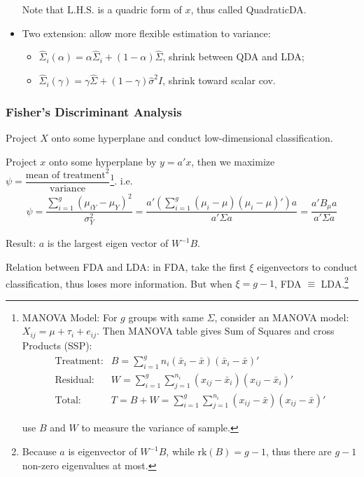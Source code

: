 \begin{itemize}[topsep=2pt,itemsep=2pt]
        Note that $  \mathrm{L.H.S.} $ is a quadric form of $ x $, thus called QuadraticDA.
        \item Two extension: allow more flexible estimation to variance:
        \begin{itemize}[topsep=2pt,itemsep=2pt]
            \item $ \hat{\Sigma }_i(\alpha )=\alpha\hat{\Sigma }_i+(1-\alpha )\hat{\Sigma } $, shrink between QDA and LDA;
            \item $ \hat{\Sigma }_i(\gamma )=\gamma \hat{\Sigma }+(1-\gamma )\hat{\sigma }^2I $, shrink toward scalar cov.
        \end{itemize}
        
            
    \end{itemize}
    

\subsubsection{Fisher's Discriminant Analysis}
    Project $ X $ onto some hyperplane and conduct low-dimensional classification.

    Project $ x $ onto some hyperplane by $ y=a'x  $, then we maximize $ \psi =\dfrac{\text{mean of treatment}^2}{\text{variance}} $\footnote{MANOVA Model:    
    For $ g $ groups with same $ \Sigma  $, consider an MANOVA model: $ X_{ij}=\mu +\tau_i+e_{ij} $. Then MANOVA table gives Sum of Squares and cross Products (SSP):
    \begin{align}
        \text{Treatment:}&B=\sum_{i=1}^gn_i(\bar{x}_i-\bar{x})(\bar{x}_i-\bar{x})'\\
        \text{Residual:}&W=\sum_{i=1}^g\sum_{j=1}^{n_i}(x_{ij}-\bar{x}_i)(x_{ij}-\bar{x}_i)'\\
        \text{Total:}&T=B+W=\sum_{i=1}^g\sum_{j=1}^{n_i}(x_{ij}-\bar{x})(x_{ij}-\bar{x})'
    \end{align}

    use $ B $ and $ W $ to measure the variance of sample.
    }. i.e.
    \begin{align}
        \psi =\dfrac{\sum\limits_{i=1}^g(\mu_{iY}-\mu_Y)^2}{\sigma ^2_Y}=\dfrac{a'\left(\sum\limits_{i=1}^g(\mu_i-\mu)(\mu_i-\mu)'\right)a}{a'\Sigma a}=\dfrac{a'B_\mu a}{a'\Sigma a}
    \end{align}
    
    Result: $ a $ is the largest eigen vector of $ W^{-1}B $.

    Relation between FDA and LDA: in FDA, take the first $ \xi  $ eigenvectors to conduct classification, thus loses more information. But when $ \xi =g-1 $, FDA $ \equiv $ LDA.\footnote{Because $ a $ is eigenvector of $ W^{-1}B $, while $ \mathrm{rk}(B)=g-1 $, thus there are $ g-1 $ non-zero eigenvalues at most.}
   
